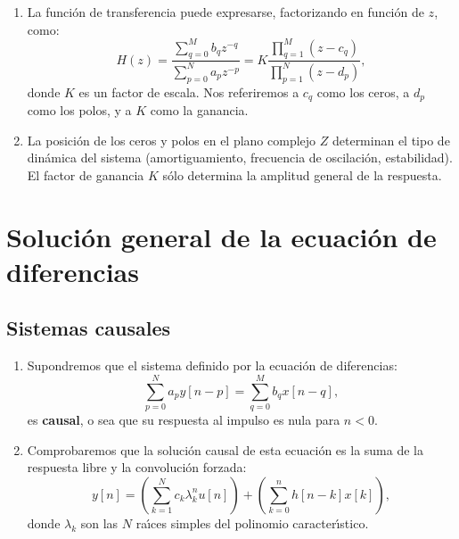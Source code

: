 \documentclass[11pt,a4paper,openany]{book}
\begin{document}
\begin{enumerate}
	\item La funci\'{o}n de transferencia puede expresarse, factorizando en función de $z$, como:
	\begin{equation}
		H(z) = \frac{\sum_{q=0}^{M}b_{q}z^{-q}}{\sum_{p=0}^{N}a_{p}z^{-p}} = K \frac{\prod_{q=1}^{M} (z-c_{q})}{\prod_{p=1}^{N} (z-d_{p})},
	\end{equation}
	donde $K$ es un factor de escala. Nos referiremos a $c_{q}$ como los ceros, a $d_{p}$ como los polos, y a $K$ como la ganancia.
	
	\item La posici\'{o}n de los ceros y polos en el plano complejo $Z$ determinan el tipo de din\'{a}mica del sistema (amortiguamiento, frecuencia de oscilación, estabilidad). El factor de ganancia $K$ s\'{o}lo determina la amplitud general de la respuesta.
\end{enumerate}

\section{Soluci\'{o}n general de la ecuaci\'{o}n de diferencias}

\subsection{Sistemas causales}

\begin{enumerate}
	\item Supondremos que el sistema definido por la ecuaci\'{o}n de diferencias:
	\begin{equation}
		\sum_{p=0}^{N}a_{p} y[n-p] = \sum_{q=0}^{M}b_{q} x[n-q], \label{eqdtdcausal}
	\end{equation}
	es \textbf{causal}, o sea que su respuesta al impulso es nula para $n < 0$.
	
	\item Comprobaremos que la soluci\'{o}n causal de esta ecuaci\'{o}n es la suma de la respuesta libre y la convolución forzada:
	\begin{equation}
		y[n] = \left( \sum_{k=1}^{N} c_{k} \lambda_{k}^{n} u[n] \right) + \left( \sum_{k=0}^{n} h[n-k] x[k] \right), \label{solgenecdif}
	\end{equation}
	donde $\lambda_{k}$ son las $N$ ra\'{\i}ces simples del polinomio caracter\'{\i}stico.
\end{enumerate}
\end{document}
